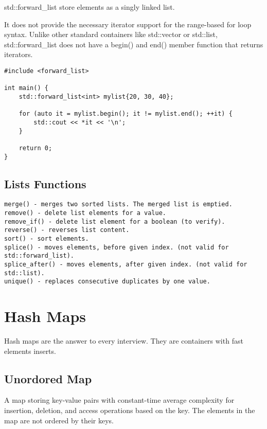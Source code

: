 std::forward\_list store elements as a singly linked list.

It does not provide the necessary iterator support for the range-based for loop syntax.
Unlike other standard containers like std::vector or std::list,
std::forward\_list does not have a begin() and end() member function that returns iterators.

\begin{verbatim}
#include <forward_list>

int main() {
    std::forward_list<int> mylist{20, 30, 40};

    for (auto it = mylist.begin(); it != mylist.end(); ++it) {
        std::cout << *it << '\n';
    }

    return 0;
}
\end{verbatim}

\subsection{Lists Functions}

\begin{verbatim}
merge() - merges two sorted lists. The merged list is emptied.
remove() - delete list elements for a value.
remove_if() - delete list element for a boolean (to verify).
reverse() - reverses list content.
sort() - sort elements.
splice() - moves elements, before given index. (not valid for std::forward_list).
splice_after() - moves elements, after given index. (not valid for std::list).
unique() - replaces consecutive duplicates by one value.
\end{verbatim}

\section{Hash Maps}

Hash maps are the answer to every interview. They are containers with fast elements inserts.

\subsection{Unordored Map}

A map storing key-value pairs with constant-time average complexity for insertion,
deletion, and access operations based on the key.
The elements in the map are not ordered by their keys.

